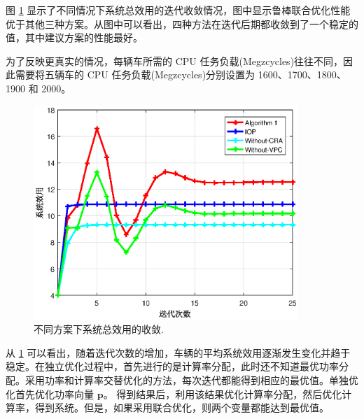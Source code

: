 图 \ref{F7} 显示了不同情况下系统总效用的迭代收敛情况，图中显示鲁棒联合优化性能优于其他三种方案。从图中可以看出，四种方法在迭代后期都收敛到了一个稳定的值，其中建议方案的性能最好。

为了反映更真实的情况，每辆车所需的 CPU 任务负载(Megzcycles)往往不同，因此需要将五辆车的 CPU 任务负载(Megzcycles)分别设置为 1600、1700、1800、1900 和 2000。

\begin{figure}[H]
\centering
\includegraphics[width=10cm]{figures//chap3//compare.eps}
\caption{不同方案下系统总效用的收敛.}
\label{F7}
\end{figure}

从 \ref{F7} 可以看出，随着迭代次数的增加，车辆的平均系统效用逐渐发生变化并趋于稳定。在独立优化过程中，首先进行的是计算率分配，此时还不知道最优功率分配。采用功率和计算率交替优化的方法，每次迭代都能得到相应的最优值。单独优化首先优化功率向量 $\mathbf{p}$。 得到结果后，利用该结果优化计算率分配，然后优化计算率，得到系统。但是，如果采用联合优化，则两个变量都能达到最优值。

